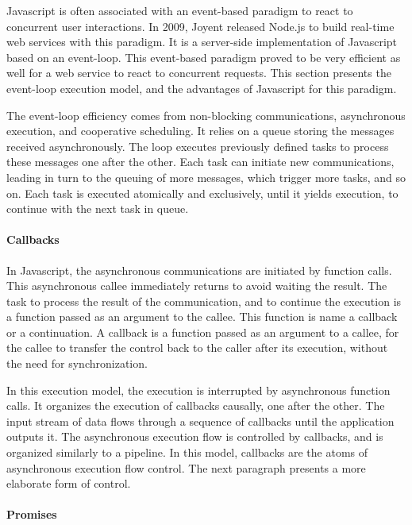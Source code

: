 Javascript is often associated with an event-based paradigm to react to concurrent user interactions.
In 2009, Joyent released Node.js to build real-time web services with this paradigm.
It is a server-side implementation of Javascript based on an event-loop.
This event-based paradigm proved to be very efficient as well for a web service to react to concurrent requests.
This section presents the event-loop execution model, and the advantages of Javascript for this paradigm.

The event-loop efficiency comes from non-blocking communications, asynchronous execution, and cooperative scheduling.
It relies on a queue storing the messages received asynchronously.
The loop executes previously defined tasks to process these messages one after the other.
Each task can initiate new communications, leading in turn to the queuing of more messages, which trigger more tasks, and so on.
Each task is executed atomically and exclusively, until it yields execution, to continue with the next task in queue.


\paragraph{Callbacks}

In Javascript, the asynchronous communications are initiated by function calls.
This asynchronous callee immediately returns to avoid waiting the result.
The task to process the result of the communication, and to continue the execution is a function passed as an argument to the callee.
This function is name a callback or a continuation.
A callback is a function passed as an argument to a callee, for the callee to transfer the control back to the caller after its execution, without the need for synchronization.

In this execution model, the execution is interrupted by asynchronous function calls.
It organizes the execution of callbacks causally, one after the other.
The input stream of data flows through a sequence of callbacks until the application outputs it.
The asynchronous execution flow is controlled by callbacks, and is organized similarly to a pipeline.
In this model, callbacks are the atoms of asynchronous execution flow control.
The next paragraph presents a more elaborate form of control.

\paragraph{Promises}

